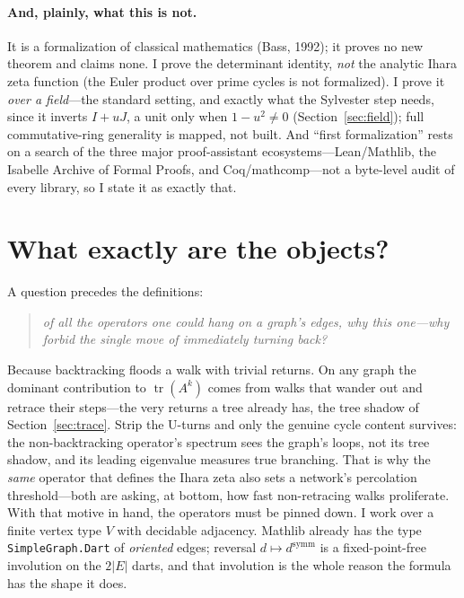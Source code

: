 \documentclass[11pt]{article}
\newcommand{\lean}[1]{\texttt{#1}}
\begin{document}
\paragraph{And, plainly, what this is not.} It is a formalization of classical mathematics (Bass,
1992); it proves no new theorem and claims none. I prove the determinant identity, \emph{not} the
analytic Ihara zeta function (the Euler product over prime cycles is not formalized). I prove it
\emph{over a field}---the standard setting, and exactly what the Sylvester step needs, since it
inverts $I+uJ$, a unit only when $1-u^2\neq0$ (Section~\ref{sec:field}); full commutative-ring
generality is mapped, not built. And ``first formalization'' rests on a search of the three major
proof-assistant ecosystems---Lean/Mathlib, the Isabelle Archive of Formal Proofs, and
Coq/mathcomp---not a byte-level audit of every library, so I state it as exactly that.



\section{What exactly are the objects?}
\label{sec:setting}

A question precedes the definitions:
\begin{quote}\itshape
  of all the operators one could hang on a graph's edges, why \emph{this} one---why forbid the
  single move of immediately turning back?
\end{quote}
Because backtracking floods a walk with trivial returns. On any graph the dominant contribution to
$\operatorname{tr}(A^k)$ comes from walks that wander out and retrace their steps---the very returns
a tree already has, the tree shadow of Section~\ref{sec:trace}. Strip the U-turns and only the
genuine cycle content survives: the non-backtracking operator's spectrum sees the graph's loops, not
its tree shadow, and its leading eigenvalue measures true branching. That is why the \emph{same}
operator that defines the Ihara zeta also sets a network's percolation threshold---both are asking,
at bottom, how fast non-retracing walks proliferate. With that motive in hand, the operators must be
pinned down. I work over a finite vertex
type $V$ with decidable adjacency. Mathlib already has the type \lean{SimpleGraph.Dart} of
\emph{oriented} edges; reversal $d\mapsto d^{\mathrm{symm}}$ is a fixed-point-free involution on the
$2|E|$ darts, and that involution is the whole reason the formula has the shape it does.
\end{document}
